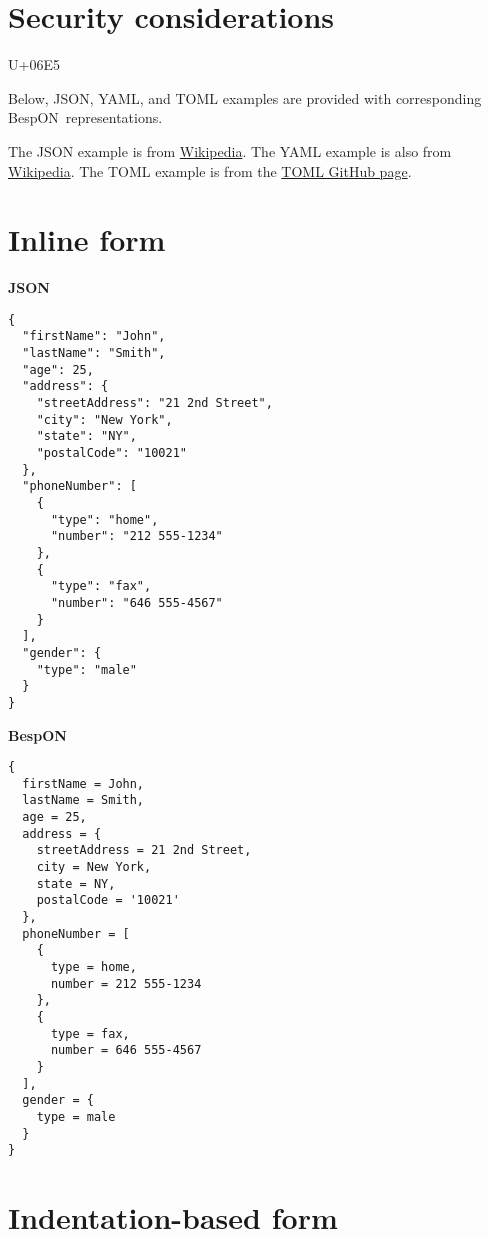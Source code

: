 \documentclass[11pt]{article}
\newcommand{\bespon}{BespON}
\begin{document}
{{\section{Security considerations}

U+06E5


\pagebreak
\begin{appendices}

Below, JSON, YAML, and TOML examples are provided with corresponding \bespon\ representations.

The JSON example is from \href{https://en.wikipedia.org/wiki/JSON}{Wikipedia}.  The YAML example is also from \href{https://en.wikipedia.org/wiki/YAML}{Wikipedia}.  The TOML example is from the \href{https://github.com/toml-lang/toml}{TOML GitHub page}.


\section{Inline form}


\begin{tcolorbox}{}
\begin{multicols}{2}

\centering \textbf{JSON}
\begin{Verbatim}[formatcom=\color{DarkGreen}]
{
  "firstName": "John",
  "lastName": "Smith",
  "age": 25,
  "address": {
    "streetAddress": "21 2nd Street",
    "city": "New York",
    "state": "NY",
    "postalCode": "10021"
  },
  "phoneNumber": [
    {
      "type": "home",
      "number": "212 555-1234"
    },
    {
      "type": "fax",
      "number": "646 555-4567"
    }
  ],
  "gender": {
    "type": "male"
  }
}
\end{Verbatim}
\columnbreak
\centering \textbf{BespON}

\begin{Verbatim}
{
  firstName = John,
  lastName = Smith,
  age = 25,
  address = {
    streetAddress = 21 2nd Street,
    city = New York,
    state = NY,
    postalCode = '10021'
  },
  phoneNumber = [
    {
      type = home,
      number = 212 555-1234
    },
    {
      type = fax,
      number = 646 555-4567
    }
  ],
  gender = {
    type = male
  }
}
\end{Verbatim}
\end{multicols}
\end{tcolorbox}



\section{Indentation-based form}



\end{appendices}}}
\end{document}
